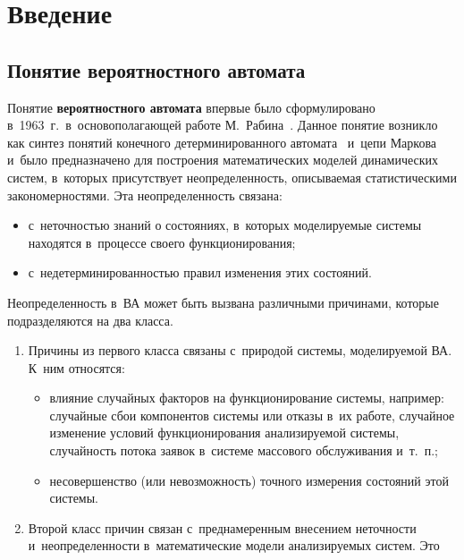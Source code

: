\begin{multicols}{2}

\label{st\stat}


\section{Введение}

\vspace*{2pt}

\subsection{Понятие вероятностного автомата}

\vspace*{2pt}

Понятие \textbf{вероятностного автомата} впервые было
сформулировано в~1963~г.\ в~основополагающей работе
М.~Рабина~\cite{1-mir}. Данное понятие возникло как синтез понятий конечного
детерминированного автомата~\cite{2-mir} и~цепи Маркова~\cite{3-mir}
и~было предназначено для построения математических моделей
динамических сис\-тем, в~которых присутствует неопределенность,
описываемая статистическими закономерностями. Эта неопределенность
связана:
\begin{itemize}
\item с~неточностью знаний о состояниях, в~которых
моделируемые сис\-те\-мы находятся в~процессе своего функционирования;
\item  с~недетерминированностью правил изменения этих состояний.
\end{itemize}
Неопределенность в~ВА может быть вызвана различными причинами,
которые подразделяются на два класса.
\begin{enumerate}
\item Причины из первого
класса связаны с~природой сис\-те\-мы, моделируемой 
ВА. К~ним относятся:
\begin{itemize}
\item влияние случайных факторов на
функционирование сис\-те\-мы, например: случайные сбои компонентов
сис\-те\-мы или отказы в~их работе,  случайное изменение  условий
функционирования анализируемой сис\-те\-мы, случайность потока заявок в~сис\-те\-ме массового обслуживания и~т.~п.;
\item несовершенство (или
невозможность)  точного измерения состояний этой сис\-темы.
\end{itemize}
\item
Второй класс причин связан с~преднамеренным внесением неточности и~неопределен\-ности в~математические модели анализируемых сис\-тем. Это

\end{enumerate}
\end{multicols}
